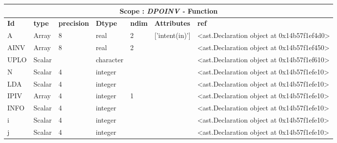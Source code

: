 \documentclass{report}
\begin{document}
 \vspace{1cm}

\begin{center}
\begin{longtable}{|p{3.5cm}|p{1.5cm}|p{1.5cm}|p{1.5cm}|p{1cm}|p{2cm}|p{4cm}| }
\hline
\multicolumn{7}{|c|}{\textbf{Scope : \qquad}  \textbf{\textit{DPOINV - }Function}}\\ 
\hline
\textbf{Id} & \textbf{type} & \textbf{precision} & \textbf{Dtype} & \textbf{ndim} & \textbf{Attributes} & \textbf{ref} \\\hline

A & Array & 8 & real & 2 & ['intent(in)'] & <ast.Declaration object at 0x14b57f1ef4d0> \\\hline

AINV & Array & 8 & real & 2 &  & <ast.Declaration object at 0x14b57f1ef450> \\\hline

UPLO & Scalar &  & character &  &  & <ast.Declaration object at 0x14b57f1ef610> \\\hline

N & Scalar & 4 & integer &  &  & <ast.Declaration object at 0x14b57f1efe10> \\\hline

LDA & Scalar & 4 & integer &  &  & <ast.Declaration object at 0x14b57f1efe10> \\\hline

IPIV & Array & 4 & integer & 1 &  & <ast.Declaration object at 0x14b57f1efe10> \\\hline

INFO & Scalar & 4 & integer &  &  & <ast.Declaration object at 0x14b57f1efe10> \\\hline

i & Scalar & 4 & integer &  &  & <ast.Declaration object at 0x14b57f1efe10> \\\hline

j & Scalar & 4 & integer &  &  & <ast.Declaration object at 0x14b57f1efe10> \\\hline

\end{longtable}
\end{center}

 \vspace{1cm}
\end{document}
